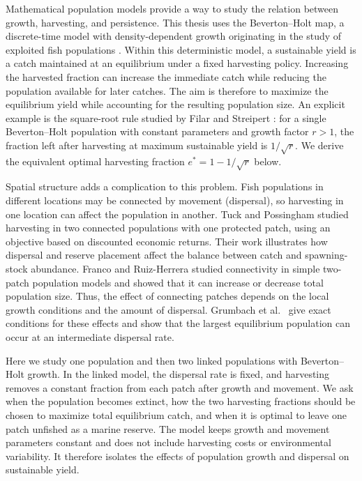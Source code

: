 \documentclass{article}
\numberwithin{equation}{section}
\begin{document}
\medskip
Mathematical population models provide a way to study the relation between
growth, harvesting, and persistence. This thesis uses the Beverton--Holt
map, a discrete-time model with density-dependent growth originating in
the study of exploited fish populations \cite{beverton-holt-1957}.
Within this deterministic model, a sustainable yield is a catch maintained
at an equilibrium under a fixed harvesting policy. Increasing the
harvested fraction can increase the immediate catch while reducing the
population available for later catches. The aim is therefore to maximize
the equilibrium yield while accounting for the resulting population size.
An explicit example is the square-root rule studied by Filar and
Streipert \cite{filar-streipert-2022}: for a single Beverton--Holt population
with constant parameters and growth factor $r>1$, the fraction left after
harvesting at maximum sustainable yield is $1/\sqrt{r}$. We derive the
equivalent optimal harvesting fraction $e^*=1-1/\sqrt{r}$ below.

\medskip
Spatial structure adds a complication to this problem. Fish populations in
different locations may be connected by movement (dispersal), so harvesting in one
location can affect the population in another. Tuck and Possingham
\cite{tuck-possingham-2000} studied harvesting in two connected populations
with one protected patch, using an objective based on discounted economic
returns. Their work illustrates how dispersal and reserve placement affect
the balance between catch and spawning-stock abundance. Franco and
Ruiz-Herrera \cite{franco-ruiz-herrera-2015} studied connectivity in simple
two-patch population models and showed that it can increase or decrease
total population size. Thus, the effect of connecting patches depends on
the local growth conditions and the amount of dispersal.
Grumbach et al.\ \cite{grumbach-2023} give exact conditions for these
effects and show that the largest equilibrium population can occur at an
intermediate dispersal rate.

\medskip
Here we study one population and then two linked populations with
Beverton--Holt growth. In the linked model, the dispersal rate is fixed,
and harvesting removes a constant fraction from each patch after growth
and movement. We ask when the population becomes extinct, how the two
harvesting fractions should be chosen to maximize total equilibrium
catch, and when it is optimal to leave one patch unfished as a marine reserve. The model
keeps growth and movement parameters constant and does not include
harvesting costs or environmental variability. It therefore isolates the
effects of population growth and dispersal on sustainable yield.
\end{document}
